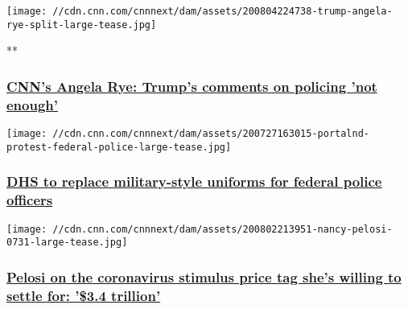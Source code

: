 \href{/videos/politics/2020/08/05/trump-policing-systemic-racism-black-americans-axios-angela-rye-cpt-vpx.cnn}{}

\texttt{[image: //cdn.cnn.com/cnnnext/dam/assets/200804224738-trump-angela-rye-split-large-tease.jpg]}

**

\hypertarget{cnns-angela-rye-trumps-comments-on-policing-not-enough}{%
\subsubsection{\texorpdfstring{\href{/videos/politics/2020/08/05/trump-policing-systemic-racism-black-americans-axios-angela-rye-cpt-vpx.cnn}{CNN's
Angela Rye: Trump's comments on policing 'not
enough'}}{CNN's Angela Rye: Trump's comments on policing 'not enough'}}\label{cnns-angela-rye-trumps-comments-on-policing-not-enough}}

\href{/2020/08/04/politics/dhs-replace-military-style-uniforms/index.html}{}

\texttt{[image: //cdn.cnn.com/cnnnext/dam/assets/200727163015-portalnd-protest-federal-police-large-tease.jpg]}

\hypertarget{dhs-to-replace-military-style-uniforms-for-federal-police-officers}{%
\subsubsection{\texorpdfstring{\href{/2020/08/04/politics/dhs-replace-military-style-uniforms/index.html}{DHS
to replace military-style uniforms for federal police
officers}}{DHS to replace military-style uniforms for federal police officers}}\label{dhs-to-replace-military-style-uniforms-for-federal-police-officers}}

\href{/2020/08/04/politics/pelosi-stimulus-negotiation/index.html}{}

\texttt{[image: //cdn.cnn.com/cnnnext/dam/assets/200802213951-nancy-pelosi-0731-large-tease.jpg]}

\hypertarget{pelosi-on-the-coronavirus-stimulus-price-tag-shes-willing-to-settle-for-34-trillion}{%
\subsubsection{\texorpdfstring{\href{/2020/08/04/politics/pelosi-stimulus-negotiation/index.html}{Pelosi
on the coronavirus stimulus price tag she's willing to settle for:
'\$3.4
trillion'}}{Pelosi on the coronavirus stimulus price tag she's willing to settle for: '\$3.4 trillion'}}\label{pelosi-on-the-coronavirus-stimulus-price-tag-shes-willing-to-settle-for-34-trillion}}

